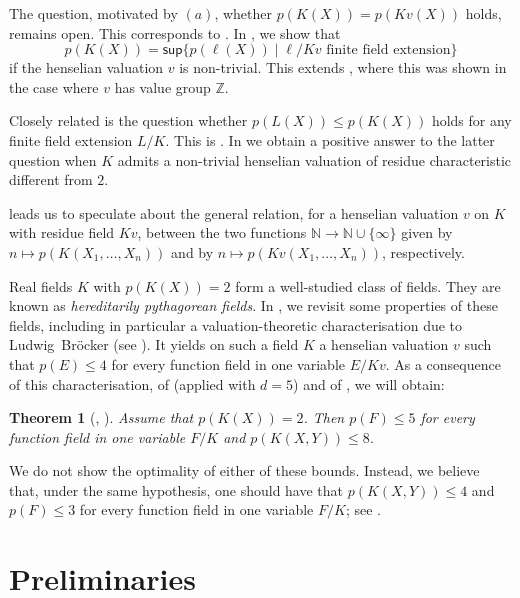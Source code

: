 \documentclass[12pt,leqno]{amsart}
\newcommand{\nat}{\mathbb{N}}
\newcommand{\zz}{\mathbb Z}
\renewcommand{\sup}{\mathsf{sup}}
\renewcommand{\leq}{\leqslant}
\numberwithin{equation}{section}
\newtheorem{thm}[equation]{Theorem}
\theoremstyle{definition}
\theoremstyle{plain}
\begin{document}
The question, motivated by $(a)$, whether $p(K(X))=p(Kv(X))$ holds, remains  open. This corresponds to \cite[Conjecture 4.16]{BGVG14}.
In , we show that
\[p(K(X))=\sup\{p(\ell(X))\mid \ell/Kv\mbox{ finite field extension}\}\]
if the henselian valuation $v$ is non-trivial. 
This extends \cite[Cor.~6.9]{BGVG14}, where this was shown in the case where $v$ has value group $\zz$.

Closely related is the question whether $p(L(X))\leq p(K(X))$ holds for any finite field extension $L/K$. This is \cite[Conjecture 4.15]{BGVG14}.
In  we obtain a positive answer to the latter question when $K$ admits a non-trivial henselian valuation of residue characteristic different from $2$.

 leads us to speculate about the general relation, for a henselian valuation $v$ on $K$ with residue field $Kv$, between the two 
functions $\nat\to\nat\cup\{\infty\}$ given by $n\mapsto p(K(X_1,\dots,X_n))$ and by $n\mapsto p(Kv(X_1,\dots,X_n))$, respectively.

Real fields $K$ with $p(K(X))=2$ form a well-studied class of fields.
They are known as \emph{hereditarily pythagorean fields}. 
In , we revisit some properties of these fields, including in particular a valuation-theoretic characterisation due to
Ludwig~Br\"ocker \cite{Bro76} (see ). 
It yields on such a field $K$ a henselian valuation $v$ such that  $p(E) \leq 4$ for every function field in one variable $E/Kv$.
As a consequence of this characterisation, of  (applied with $d=5$) and of , we will obtain:

\begin{thm}[, ]\label{T:main-2}
Assume that $p(K(X))= 2$.
Then $p(F) \leq 5$ for every function field in one variable $F/K$ and $p(K(X, Y)) \leq 8$.
\end{thm}

We do not show the optimality of either of these bounds. 
Instead, we believe that, under the same hypothesis, one should have that $p(K(X,Y))\leq 4$ and $p(F)\leq 3$ for every function field in one variable $F/K$; see . 

\section{Preliminaries} %
\label{sect:preliminaries} %
\end{document}
